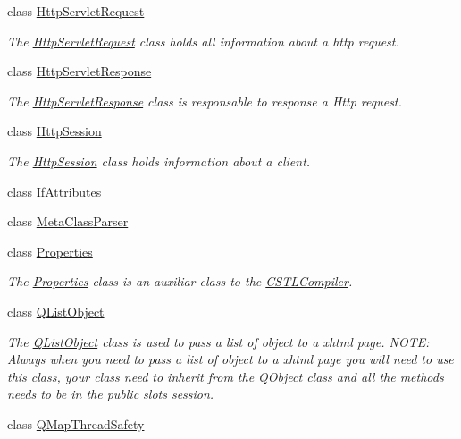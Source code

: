 \begin{DoxyCompactItemize}
class \hyperlink{class_c_w_f_1_1_http_servlet_request}{Http\+Servlet\+Request}
\begin{DoxyCompactList}\small\item\em The \hyperlink{class_c_w_f_1_1_http_servlet_request}{Http\+Servlet\+Request} class holds all information about a http request. \end{DoxyCompactList}\item 
class \hyperlink{class_c_w_f_1_1_http_servlet_response}{Http\+Servlet\+Response}
\begin{DoxyCompactList}\small\item\em The \hyperlink{class_c_w_f_1_1_http_servlet_response}{Http\+Servlet\+Response} class is responsable to response a Http request. \end{DoxyCompactList}\item 
class \hyperlink{class_c_w_f_1_1_http_session}{Http\+Session}
\begin{DoxyCompactList}\small\item\em The \hyperlink{class_c_w_f_1_1_http_session}{Http\+Session} class holds information about a client. \end{DoxyCompactList}\item 
class \hyperlink{class_c_w_f_1_1_if_attributes}{If\+Attributes}
\item 
class \hyperlink{class_c_w_f_1_1_meta_class_parser}{Meta\+Class\+Parser}
\item 
class \hyperlink{class_c_w_f_1_1_properties}{Properties}
\begin{DoxyCompactList}\small\item\em The \hyperlink{class_c_w_f_1_1_properties}{Properties} class is an auxiliar class to the \hyperlink{class_c_w_f_1_1_c_s_t_l_compiler}{C\+S\+T\+L\+Compiler}. \end{DoxyCompactList}\item 
class \hyperlink{class_c_w_f_1_1_q_list_object}{Q\+List\+Object}
\begin{DoxyCompactList}\small\item\em The \hyperlink{class_c_w_f_1_1_q_list_object}{Q\+List\+Object} class is used to pass a list of object to a xhtml page. N\+O\+T\+E\+: Always when you need to pass a list of object to a xhtml page you will need to use this class, your class need to inherit from the Q\+Object class and all the methods needs to be in the public slots session. \end{DoxyCompactList}\item 
class \hyperlink{class_c_w_f_1_1_q_map_thread_safety}{Q\+Map\+Thread\+Safety}

\end{DoxyCompactItemize}
